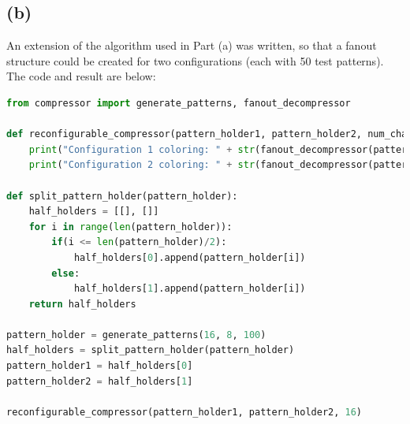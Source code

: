 \documentclass[letterpaper]{article} %
\begin{document}
\subsection*{(b)}
\hspace{0.5cm}An extension of the algorithm used in Part (a) was written, so that a fanout structure could be created for two configurations (each with 50 test patterns). The code and result are below:
\begin{lstlisting}[language=Python, caption=Python code used to generate test-patterns; produce the conflict graph; and color the graph in two configurations]
	from compressor import generate_patterns, fanout_decompressor

def reconfigurable_compressor(pattern_holder1, pattern_holder2, num_chains):
    print("Configuration 1 coloring: " + str(fanout_decompressor(pattern_holder1, num_chains)))
    print("Configuration 2 coloring: " + str(fanout_decompressor(pattern_holder2, num_chains)))

def split_pattern_holder(pattern_holder):
    half_holders = [[], []]
    for i in range(len(pattern_holder)):
        if(i <= len(pattern_holder)/2):
            half_holders[0].append(pattern_holder[i])
        else:
            half_holders[1].append(pattern_holder[i])
    return half_holders

pattern_holder = generate_patterns(16, 8, 100)
half_holders = split_pattern_holder(pattern_holder)
pattern_holder1 = half_holders[0]
pattern_holder2 = half_holders[1]

reconfigurable_compressor(pattern_holder1, pattern_holder2, 16)
\end{lstlisting}
\end{document}
